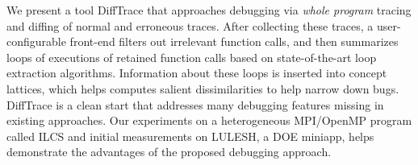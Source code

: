 We present a tool
DiffTrace that approaches debugging via {\em whole program} tracing and
diffing of normal and erroneous traces.
%
After collecting these traces,
a user-configurable front-end filters out irrelevant function calls,
and then summarizes loops of executions of retained function
calls based on state-of-the-art loop extraction algorithms.
%
Information about these loops is inserted 
into concept lattices, which helps
computes salient dissimilarities to help narrow down bugs.
%
DiffTrace is a clean start that addresses many
debugging features missing in existing approaches.
%
Our experiments on a heterogeneous MPI/OpenMP program called
ILCS and initial measurements on LULESH, a DOE miniapp,
helps demonstrate the advantages of the proposed debugging approach.






